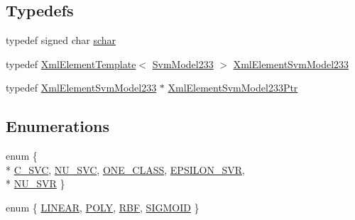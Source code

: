 \subsection*{Typedefs}
\begin{DoxyCompactItemize}
\item 
typedef signed char \hyperlink{namespace_s_v_m233_afb4ec48497a25626275d52266ac9d7d8}{schar}
\item 
typedef \hyperlink{class_k_k_b_1_1_xml_element_template}{Xml\+Element\+Template}$<$ \hyperlink{struct_s_v_m233_1_1_svm_model233}{Svm\+Model233} $>$ \hyperlink{namespace_s_v_m233_ac980a127b814b032d64ad46c43530ac0}{Xml\+Element\+Svm\+Model233}
\item 
typedef \hyperlink{namespace_s_v_m233_ac980a127b814b032d64ad46c43530ac0}{Xml\+Element\+Svm\+Model233} $\ast$ \hyperlink{namespace_s_v_m233_afcdf865b0b4b533ca407830b3dbb6ef1}{Xml\+Element\+Svm\+Model233\+Ptr}
\end{DoxyCompactItemize}
\subsection*{Enumerations}
\begin{DoxyCompactItemize}
\item 
enum \{ \\*
\hyperlink{namespace_s_v_m233_acde4c278f323c82a6b41c27f6f30738aa942f03bda3ae7dbb9e945f161c95ab97}{C\+\_\+\+S\+VC}, 
\hyperlink{namespace_s_v_m233_acde4c278f323c82a6b41c27f6f30738aa7705bf71b9d3c7169b4d201acb2b30b8}{N\+U\+\_\+\+S\+VC}, 
\hyperlink{namespace_s_v_m233_acde4c278f323c82a6b41c27f6f30738aaea64d54fb16ebcd95d48c4aef97036df}{O\+N\+E\+\_\+\+C\+L\+A\+SS}, 
\hyperlink{namespace_s_v_m233_acde4c278f323c82a6b41c27f6f30738aae7f29e93ef95067dcc6827e4fe3071c7}{E\+P\+S\+I\+L\+O\+N\+\_\+\+S\+VR}, 
\\*
\hyperlink{namespace_s_v_m233_acde4c278f323c82a6b41c27f6f30738aaa9c624ae638f160fb1f00081960014b6}{N\+U\+\_\+\+S\+VR}
 \}
\item 
enum \{ \hyperlink{namespace_s_v_m233_a44221c48118ea92c46a316a00e8f9e11a7e5af7f5d7bcd3518975d6f3eb7e117b}{L\+I\+N\+E\+AR}, 
\hyperlink{namespace_s_v_m233_a44221c48118ea92c46a316a00e8f9e11a8ba6f8ab5a2dcac5e164e6b0a003ec9d}{P\+O\+LY}, 
\hyperlink{namespace_s_v_m233_a44221c48118ea92c46a316a00e8f9e11a0478d3ebef66c527d9acbb734d1959d7}{R\+BF}, 
\hyperlink{namespace_s_v_m233_a44221c48118ea92c46a316a00e8f9e11a2a4910637931b0eca01a4f2be8418466}{S\+I\+G\+M\+O\+ID}
 \}
\end{DoxyCompactItemize}
